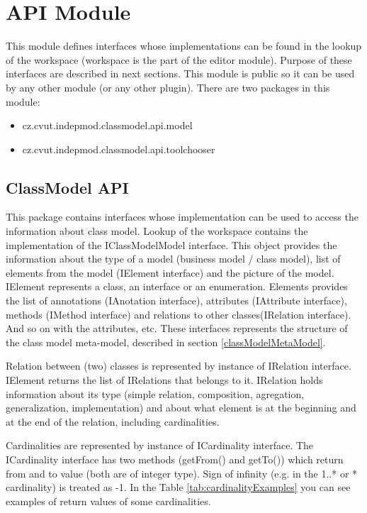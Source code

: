 \section{API Module}

This module defines interfaces whose implementations can be found in the lookup of the workspace (workspace is the part of the editor module). Purpose of these interfaces are described in next sections. This module is public so it can be used by any other module (or any other plugin). There are two packages in this module:

\begin{itemize}
    \item cz.cvut.indepmod.classmodel.api.model
    \item cz.cvut.indepmod.classmodel.api.toolchooser
\end{itemize}

\subsection{ClassModel API}
\label{section:classModelAPI}

This package contains interfaces whose implementation can be used to access the information about class model. Lookup of the workspace contains the implementation of the IClassModelModel interface. This object provides the information about the type of a model (business model / class model), list of elements from the model (IElement interface) and the picture of the model. IElement represents a class, an interface or an enumeration. Elements provides the list of annotations (IAnotation interface), attributes (IAttribute interface), methods (IMethod interface) and relations to other classes(IRelation interface). And so on with the attributes, etc. These interfaces represents the structure of the class model meta-model, described in section \ref{classModelMetaModel}.

Relation between (two) classes is represented by instance of IRelation interface. IElement returns the list of IRelations that belongs to it. IRelation holds information about its type (simple relation, composition, agregation, generalization, implementation) and about what element is at the beginning and at the end of the relation, including cardinalities. 

Cardinalities are represented by instance of ICardinality interface. The ICardinality interface has two methods (getFrom() and getTo()) which return from and to value (both are of integer type). Sign of infinity (e.g. in the 1..* or * cardinality) is treated as -1. In the Table \ref{tab:cardinalityExamples} you can see examples of return values of some cardinalities.

